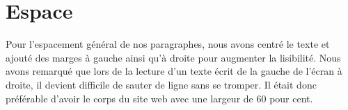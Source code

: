 \documentclass{article}
\begin{document}
\section{Espace}

\par

Pour l'espacement général de nos paragraphes, nous avons centré le texte et ajouté des marges à gauche ainsi qu'à droite pour augmenter la lisibilité. Nous avons remarqué que lors de la lecture d'un texte écrit de la gauche de l'écran à droite, il devient difficile de sauter de ligne sans se tromper. Il était donc préférable d'avoir le corps du site web avec une largeur de 60 pour cent.
\end{document}
